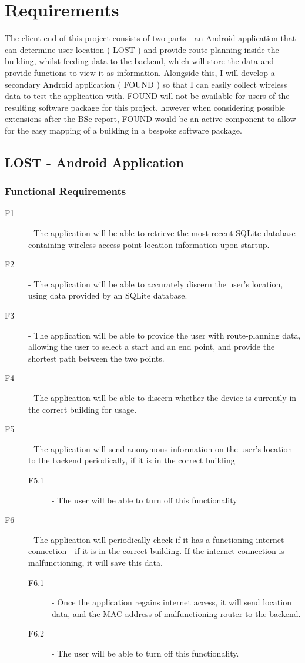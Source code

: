 \documentclass[11pt]{informatics-report}
\begin{document}
\chapter{Requirements}
The client end of this project consists of two parts - an Android application that can determine user location ( LOST ) and provide route-planning inside the building, whilst feeding data to the backend, which will store the data and provide functions to view it as information. Alongside this, I will develop a secondary Android application ( FOUND ) so that I can easily collect wireless data to test the application with. FOUND will not be available for users of the resulting software package for this project, however when considering possible extensions after the BSc report, FOUND would be an active component to allow for the easy mapping of a building in a bespoke software package.

\section{LOST - Android Application}

\subsection{Functional Requirements}
\begin{description}
\item[F1] - The application will be able to retrieve the most recent SQLite database containing wireless access point location information upon startup.
\item[F2] - The application will be able to accurately discern the user's location, using data provided by an SQLite database.
\item[F3] - The application will be able to provide the user with route-planning data, allowing the user to select a start and an end point, and provide the shortest path between the two points.
\item[F4] - The application will be able to discern whether the device is currently in the correct building for usage.
\item[F5] - The application will send anonymous information on the user's location to the backend periodically, if it is in the correct building
	\begin{description}
	\item[F5.1] - The user will be able to turn off this functionality
	\end{description}
\item[F6] - The application will periodically check if it has a functioning internet connection - if it is in the correct building. If the internet connection is malfunctioning, it will save this data.
	\begin{description}
	\item[F6.1] - Once the application regains internet access, it will send location data, and the MAC address of malfunctioning router to the backend.
	\item[F6.2] - The user will be able to turn off this functionality.
	\end{description}
\end{description}
\end{document}
